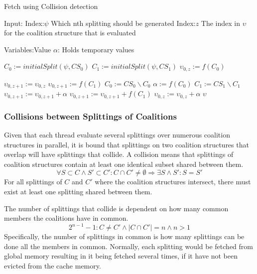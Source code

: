 \documentclass{aamas2012}
\begin{document}
\begin{algorithm}
\caption{Fetch using Collision detection \label{collision}}
Input:
Index:$\psi$ \hfill Which nth splitting should be generated
Index:$z$ \hfill The index in $\upsilon$ for the coalition structure that is evaluated 

Variables:Value $\alpha $: \hfill Holds temporary values

\begin{algorithmic}[1]
    \STATE $C_{0} := initialSplit(\psi,CS_0)$ \label{lst:line:startcol}
    \STATE $C_{1} := initialSplit(\psi,CS_1)$
    \STATE $\upsilon_{0,z} := f(C_{0})$ \label{lst:line:fetch}
    
     \label{lst:line:firstif}
      \STATE $\upsilon_{0,z+1} := \upsilon_{0,z}$
      \ELSE
      \STATE $\upsilon_{0,z+1} := f(C_{1})$
     \ENDIF \label{lst:line:firstifend}
    \STATE $C_{0} := CS_0\backslash C_{0}$ \label{lst:line:startend}
    \STATE $\alpha := f(C_{0})$
    \STATE $C_{1} := CS_1\backslash C_{1}$
      \STATE $\upsilon_{0,z+1} := \upsilon_{0,z+1}  + \alpha$
    \ELSE
      \STATE $\upsilon_{0,z+1} := \upsilon_{0,z+1} + f(C_{1})$
    \ENDIF
    \STATE $\upsilon_{0,z} := \upsilon_{0,z}  + \alpha$ \label{lst:line:endend}
\RETURN $\upsilon$
\end{algorithmic}
\end{algorithm}

\subsubsection{Collisions between Splittings of Coalitions} \label{sectionsplit}
Given that each thread evaluate several splittings over numerous coalition structures in parallel, 
it is bound that splittings on two coalition structures that overlap will have splittings that collide.
A collision means that splittings of coalition structures contain at least one identical subset shared between them.
\begin{displaymath}\forall S\subset C \wedge S' \subset C' : C \cap C' \neq \emptyset \Rightarrow \exists S \wedge S' : S = S'\end{displaymath}
For all splittings of $C$ and $C'$ where the coalition structures intersect, there must exist at least one splitting shared between them.

The number of splittings that collide is dependent on how many common members the coalitions have in common.
\begin{displaymath}2^{n-1}-1:C\neq C'\wedge |C \cap C'| = n \wedge n > 1 \end{displaymath}
Specifically, the number of splittings in common is how many splittings
can be done all the members in common.
Normally, each splitting would be fetched from global memory resulting in it being fetched several times, 
if it have not been evicted from the cache memory.
\end{document}

